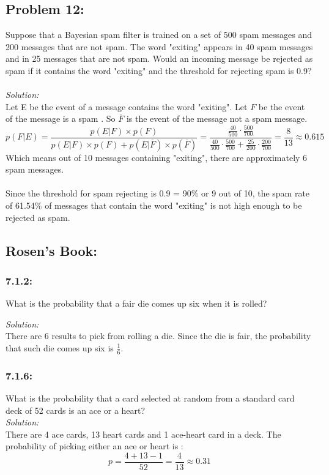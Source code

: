 \documentclass[a4paper]{article}
\begin{document}
\subsection*{Problem 12:}
Suppose that a Bayesian spam filter is trained on a set of 500 spam messages and 200 messages that are not spam. The word "exiting" appears in 40 spam messages and in 25 messages that are not spam. Would an incoming message be rejected as spam if it contains the word "exiting" and the threshold for rejecting spam is 0.9?\\\\
\textit{Solution:}\\
Let E be the event of a message contains the word "exiting". Let $F$ be the event of the message is a spam . So $\overline{F}$ is the event of the message not a spam message.
\begin{equation*}
	p(F|E) = \frac{p(E|F)\times p(F)}{p(E|F)\times p   (F) + p(E|\overline{F})\times p(\overline{F})} =\frac{\frac{40}{500}\cdot \frac{500}{700}}{\frac{40}{500}\cdot \frac{500}{700} + \frac{25}{200}\cdot \frac{200}{700}} =\frac{8}{13} \approx 0.615 
\end{equation*}
Which means out of 10 messages containing "exiting", there are approximately 6 spam messages.\\\\
Since the threshold for spam rejecting is 0.9 = 90\% or 9 out of 10, the  spam rate of 61.54\% of messages that contain the word "exiting" is not high enough to be rejected as spam.
\subsection*{Rosen's Book:}
\subsubsection*{7.1.2:}
What is the probability that a fair die comes up six when it is rolled?

\emph{Solution: }\\
There are 6 results to pick from rolling a die. Since the die is fair, the probability that such die comes up six is $\frac{1}{6}$.

\subsubsection*{7.1.6:}
What is the probability that a card selected at random from a standard card deck of 52 cards is an ace or a heart? \\
\emph{Solution: }\\
There are 4 ace cards, 13 heart cards and 1 ace-heart card in a deck. The probability of picking either an ace or heart is :
\begin{equation*}
	p = \frac{4+13-1}{52} = \frac{4}{13} \approx 0.31
\end{equation*}
\end{document}
